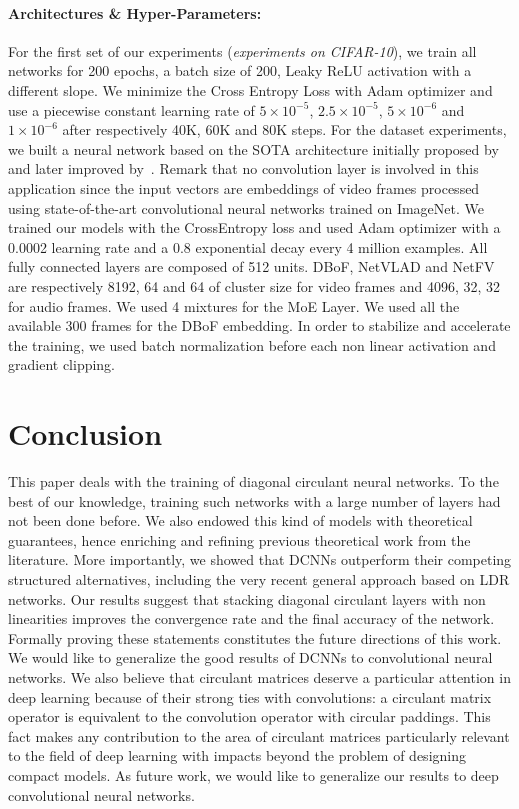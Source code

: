 \paragraph{Architectures \& Hyper-Parameters:} 
For the first set of our experiments (\emph{experiments on CIFAR-10}), we train all networks for 200 epochs, a batch size of 200, Leaky ReLU activation with a different slope.
We minimize the Cross Entropy Loss with Adam optimizer and use a piecewise constant learning rate of $5 \times 10^{-5}$, $2.5\times10^{-5}$, $5\times10^{-6}$ and $1\times10^{-6}$ after respectively 40K, 60K and 80K steps.
For the \yt dataset experiments, we built a neural network based on the SOTA architecture initially proposed by~\citet{abu2016youtube} and later improved by~\citet{miech2017learnable}.
Remark that no convolution layer is involved in this application since the input vectors are embeddings of video frames processed using state-of-the-art convolutional neural networks trained on ImageNet.
We trained our models with the CrossEntropy loss and used Adam optimizer with a 0.0002 learning rate and a 0.8 exponential decay every 4 million examples.
All fully connected layers are composed of 512 units.
DBoF, NetVLAD and NetFV are respectively 8192, 64 and 64 of cluster size for video frames and 4096, 32, 32 for audio frames.
We used 4 mixtures for the MoE Layer.
We used all the available 300 frames for the DBoF embedding.
In order to stabilize and accelerate the training, we used batch normalization before each non linear activation and gradient clipping. 

\section{Conclusion}
\label{section:ch3-conclusion}

This paper deals with the training of diagonal circulant neural networks.
To the best of our knowledge, training such networks with a large number of layers had not been done before.
We also endowed this kind of models with theoretical guarantees, hence enriching and refining previous theoretical work from the literature.
More importantly, we showed that DCNNs outperform their competing structured alternatives, including the very recent general approach based on LDR networks.
Our results suggest that stacking diagonal circulant layers with non linearities improves the convergence rate and the final accuracy of the network.
Formally proving these statements constitutes the future directions of this work.
We would like to generalize the good results of DCNNs to convolutional neural networks.
We also believe that circulant matrices deserve a particular attention in deep learning because of their strong ties with convolutions: a circulant matrix operator is equivalent to the convolution operator with circular paddings.
This fact makes any contribution to the area of circulant matrices particularly relevant to the field of deep learning with impacts beyond the problem of designing compact models.
As future work, we would like to generalize our results to deep convolutional neural networks. 


